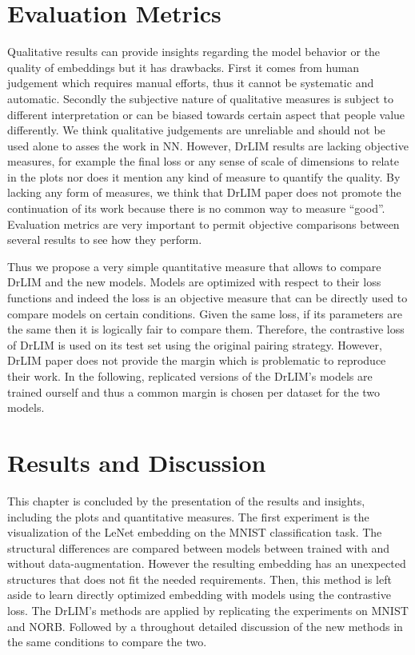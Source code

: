 \documentclass[a4paper,12pt]{report}
\begin{document}
\section{Evaluation Metrics}
Qualitative results can provide insights regarding the model behavior or the quality of embeddings but it has drawbacks.
First it comes from human judgement which requires manual efforts, thus it cannot be systematic and automatic.
Secondly the subjective nature of qualitative measures is subject to different interpretation or can be biased towards certain aspect that people value differently.
We think qualitative judgements are unreliable and should not be used alone to asses the work in NN.
However, DrLIM results are lacking objective measures, for example the final loss or any sense of scale of dimensions to relate in the plots nor does it mention any kind of measure to quantify the quality.
By lacking any form of measures, we think that DrLIM paper does not promote the continuation of its work because there is no common way to measure ``good''.
Evaluation metrics are very important to permit objective comparisons between several results to see how they perform.

Thus we propose a very simple quantitative measure that allows to compare DrLIM and the new models.
Models are optimized with respect to their loss functions and indeed the loss is an objective measure that can be directly used to compare models on certain conditions.
Given the same loss, if its parameters are the same then it is logically fair to compare them.
Therefore, the contrastive loss of DrLIM is used on its test set using the original pairing strategy.
However, DrLIM paper does not provide the margin which is problematic to reproduce their work.
In the following, replicated versions of the DrLIM's models are trained ourself and thus a common margin is chosen per dataset for the two models.

\section{Results and Discussion}

This chapter is concluded by the presentation of the results and insights, including the plots and quantitative measures.
The first experiment is the visualization of the LeNet embedding on the MNIST classification task.
The structural differences are compared between models between trained with and without data-augmentation.
However the resulting embedding has an unexpected structures that does not fit the needed requirements.
Then, this method is left aside to learn directly optimized embedding with models using the contrastive loss.
The DrLIM's methods are applied by replicating the experiments on MNIST and NORB.
Followed by a throughout detailed discussion of the new methods in the same conditions to compare the two.
\end{document}
